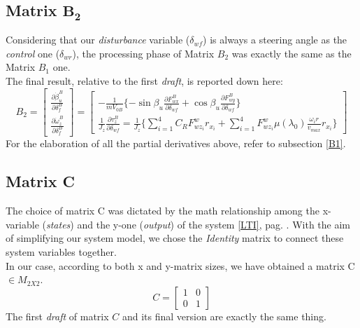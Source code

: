 \subsection{Matrix $\mathbf{B_{2}}$}
	Considering that our \textit{disturbance} variable ($\delta_{wf}$) is always a steering angle as the \textit{control} one ($\delta_{wr}$), the processing phase of Matrix $B_{2}$ was exactly the same as the Matrix $B_{1}$ one. \\ The final result, relative to the first \textit{draft}, is reported down here:
		\begin{equation}
			B_{2}=
			\begin{bmatrix}
				\frac{\partial\dot{\beta}_{u}^{B}}{\partial\delta_{f}^{B}} \\
				\frac{\partial\dot{\omega}_{z}^{B}}{\partial\delta_{f}^{B}} 
			\end{bmatrix} =
			\begin{bmatrix}
				-\frac{1}{mV_{0B}}\{-\sin\beta_{u}\frac{\partial F_{wx}^{B}}{\partial \delta_{wf}} + \cos\beta_{u}\frac{\partial F_{wy}^{B}}{\partial \delta_{wf}}\} \\
				\frac{1}{J_{z}} \frac{\partial \tau_{z}^{B}}{\partial\delta_{wf}} = \frac{1}{J_{z}} \{ \sum\limits_{i=1}^4 C_{R}F_{wz_{i}}^{w} r_{x_{i}} + \sum\limits_{i=1}^4 F_{wz_{i}}^{w} \mu(\lambda_{0}) \frac{\omega_{i} r}{v_{max}}r_{x_{i}} \}
			\end{bmatrix}
		\end{equation}
	For the elaboration of all the partial derivatives above, refer to subsection \ref{B1}.
\subsection{Matrix C}
	The choice of matrix C was dictated by the math relationship among the x-variable (\textit{states}) and the y-one (\textit{output}) of the system \ref{LTI}, pag. \pageref{LTI}. With the aim of simplifying our system model, we chose the \textit{Identity} matrix to connect these system variables together. \\ In our case, according to both x and y-matrix sizes, we have obtained a matrix C $\in M_{2X2}$.
		\begin{equation}
			C = 
			\begin{bmatrix}
				1 & 0 \\
				0 & 1
			\end{bmatrix}
		\end{equation}
	The first \textit{draft} of matrix $C$ and its final version are exactly the same thing.
